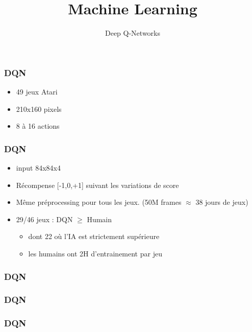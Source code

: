 \documentclass{formation}
\title{Machine Learning}
\subtitle{Deep Q-Networks}
\begin{document}
\maketitle

\begin{frame}
  \frametitle{DQN}
  \begin{itemize}
  \item 49 jeux Atari
  \item 210x160 pixels
  \item 8 à 16 actions
  \end{itemize}
\end{frame}

\begin{frame}
  \frametitle{DQN}
  \begin{itemize}
  \item input 84x84x4
  \item Récompense [-1,0,+1] suivant les variations de score
  \item Même préprocessing pour tous les jeux. (50M frames $\approx$ 38 jours de jeux)
  \item 29/46 jeux : DQN $\geq$ Humain
    \begin{itemize}
    \item dont 22 où l'IA est strictement supérieure
    \item les humains ont 2H d'entrainement par jeu
    \end{itemize}
  \end{itemize}
\end{frame}

\begin{frame}
  \frametitle{DQN}
  \href{https://www.youtube.com/watch?v=lcVg9hVya-c}{}
\end{frame}

\begin{frame}
  \frametitle{DQN}
  
\end{frame}

\begin{frame}
  \frametitle{DQN}
\end{frame}
\end{document}

